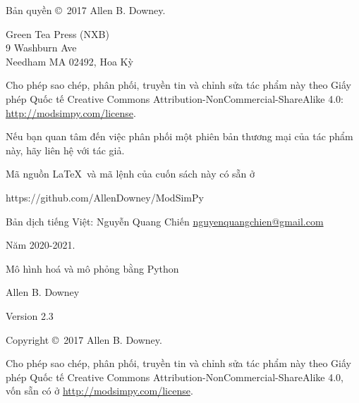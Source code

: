 \documentclass[12pt]{book}
\newcommand{\thetitle}{Mô hình hoá và mô phỏng bằng Python}
\newcommand{\theauthors}{Allen B. Downey}
\newcommand{\theversion}{2.3}
\theoremstyle{exercise}
\begin{document}
\begin{latexonly}
\pagebreak
\thispagestyle{empty}

Bản quyền \copyright ~2017 \theauthors.



\vspace{0.2in}

\begin{flushleft}
Green Tea Press (NXB)       \\
9 Washburn Ave \\
Needham MA 02492, Hoa Kỳ
\end{flushleft}

Cho phép sao chép, phân phối, truyền tin và chỉnh sửa tác phẩm này theo Giấy phép Quốc tế Creative Commons Attribution-NonCommercial-ShareAlike 4.0: \url{http://modsimpy.com/license}.


Nếu bạn quan tâm đến việc phân phối một phiên bản thương mại của tác phẩm này, hãy liên hệ với tác giả.

Mã nguồn \LaTeX\ và mã lệnh của cuốn sách này có sẵn ở

\begin{code}
https://github.com/AllenDowney/ModSimPy
\end{code}

Bản dịch tiếng Việt: Nguyễn Quang Chiến \url{nguyenquangchien@gmail.com}

Năm 2020-2021.


\cleardoublepage
\setcounter{tocdepth}{1}
\tableofcontents

\end{latexonly}



\begin{htmlonly}

\vspace{1em}

{\Large \thetitle}

{\large \theauthors}

Version \theversion

\vspace{1em}

Copyright \copyright ~2017 \theauthors.

Cho phép sao chép, phân phối, truyền tin và chỉnh sửa tác phẩm này theo Giấy phép Quốc tế Creative Commons Attribution-NonCommercial-ShareAlike 4.0, vốn sẵn có ở \url{http://modsimpy.com/license}.

\vspace{1em}

\setcounter{chapter}{-1}

\end{htmlonly}
\end{document}
